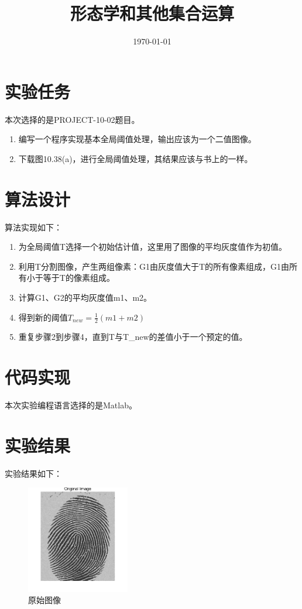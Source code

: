 \documentclass{../source/Experiment}
\title{形态学和其他集合运算}
\date{\today}
\begin{document}
\makecover
\section{实验任务}

本次选择的是PROJECT-10-02题目。

\begin{enumerate}
    \item 编写一个程序实现基本全局阈值处理，输出应该为一个二值图像。
    \item 下载图10.38(a)，进行全局阈值处理，其结果应该与书上的一样。
\end{enumerate}

\section{算法设计}
算法实现如下：

\begin{enumerate}
    \item 为全局阈值T选择一个初始估计值，这里用了图像的平均灰度值作为初值。
    \item 利用T分割图像，产生两组像素：G1由灰度值大于T的所有像素组成，G1由所有小于等于T的像素组成。
    \item 计算G1、G2的平均灰度值m1、m2。
    \item 得到新的阈值$\displaystyle T_{new} = \frac{1}{2}(m1+m2)$
    \item 重复步骤2到步骤4，直到T与T\_new的差值小于一个预定的值。
\end{enumerate}


\section{代码实现}
本次实验编程语言选择的是Matlab。



\section{实验结果}
实验结果如下：

\begin{figure}[H]
    \centering
    \includegraphics[width = 0.4\textwidth]{第五次/lab5-1.jpg}
    \caption{原始图像}
\end{figure}
\end{document}
